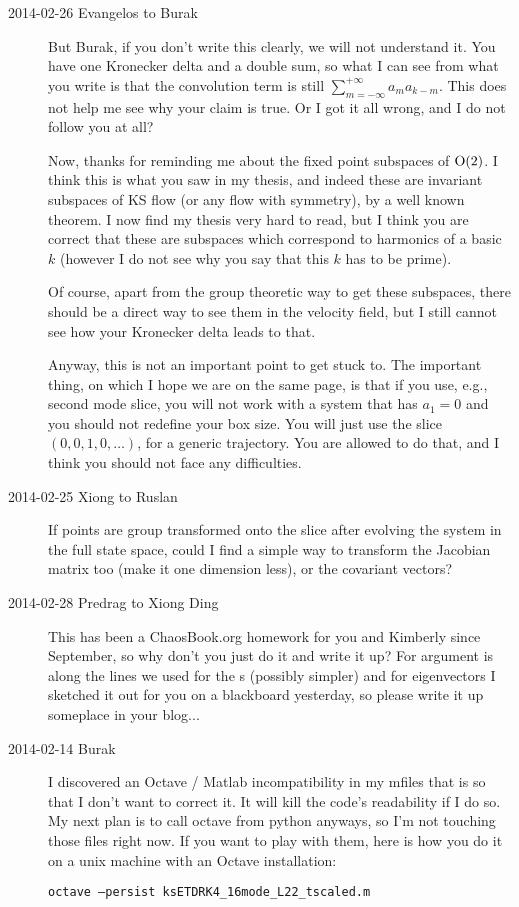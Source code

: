 \begin{description}
\item[2014-02-26 Evangelos to Burak] But Burak, if you don't write this clearly,
we will not understand it. You have one Kronecker delta and a double sum,
so what I can see from what you write is that the convolution term is still
$\sum_{m=-\infty}^{+\infty}a_{m}a_{k-m}$. This does not help me see why
your claim is true. Or I got it all wrong, and I do not follow you at all?

Now, thanks for reminding me about the fixed point subspaces of $\textrm{O}(2)$.
I think this is what you saw in my thesis, and indeed these are invariant
subspaces of KS flow (or any flow with  symmetry), by a well known
theorem. I now find my thesis very hard to read, but I think you are correct that these are
subspaces which correspond to harmonics of a basic $k$ (however I do not see
why you say that this $k$ has to be prime).

Of course, apart from the group theoretic way to get these
subspaces, there should be a direct way to see them in the velocity field,
but I still cannot see how your Kronecker delta leads to that.

Anyway, this is not an important point to get stuck to. The important thing,
on which I hope we are on the same page, is that if you use, e.g., second mode slice,
you will not work with a system that has $a_1=0$ and you should not redefine your
box size. You will just use the slice $(0,0,1,0,\ldots)$,
for a generic trajectory. You are allowed to do that, and I think you should
not face any difficulties.

\item[2014-02-25 Xiong to Ruslan] If points are group transformed
onto the slice after evolving the system in the full state space,
could I find a simple way to transform the Jacobian matrix too
(make it one dimension less), or the covariant vectors?

\item[2014-02-28 Predrag to Xiong Ding] This has been a
ChaosBook.org homework for you and Kimberly since September,  so why don't you just do it and write it up? For {\jacobianMs} argument is along the lines we
used for the
{\PoincSec s} (possibly simpler) and
for eigenvectors I sketched it out for you on a blackboard yesterday, so
please write it up someplace in your blog...



\renewcommand{\ssp}{a}

\item[2014-02-14 Burak] I discovered an Octave / Matlab incompatibility in
my mfiles that is so 
that I don't want to correct it. It will kill the code's readability if I
do so. My next plan is to call octave from python anyways, so I'm not touching
those files right now. If you want to play with them, here is how you do
it on a unix machine with an Octave installation:

\texttt{octave --persist ksETDRK4\_16mode\_L22\_tscaled.m}


\end{description}

